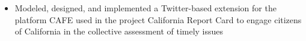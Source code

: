 \documentclass[10pt,a4paper]{altacv}
\begin{document}










\clearpage


\begin{itemize}
\item Modeled, designed, and implemented a Twitter-based extension for the platform CAFE used in the project California Report Card to engage citizens of California in the collective assessment of timely issues
\end{itemize}
\end{document}
